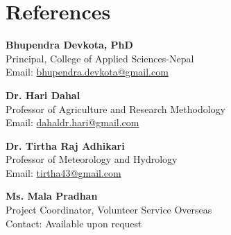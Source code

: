 \documentclass[a4paper,10pt]{article}
\begin{document}
\vspace{0.3cm}

\section*{References}
\noindent
\textbf{Bhupendra Devkota, PhD} \\
Principal, College of Applied Sciences-Nepal \\
Email: \href{mailto:bhupendra.devkota@gmail.com}{bhupendra.devkota@gmail.com}

\vspace{0.2cm}

\noindent
\textbf{Dr. Hari Dahal} \\
Professor of Agriculture and Research Methodology \\
Email: \href{mailto:dahaldr.hari@gmail.com}{dahaldr.hari@gmail.com}

\vspace{0.2cm}

\noindent
\textbf{Dr. Tirtha Raj Adhikari} \\
Professor of Meteorology and Hydrology \\
Email: \href{mailto:tirtha43@gmail.com}{tirtha43@gmail.com}

\vspace{0.2cm}

\noindent
\textbf{Ms. Mala Pradhan} \\
Project Coordinator, Volunteer Service Overseas \\
Contact: Available upon request
\end{document}
